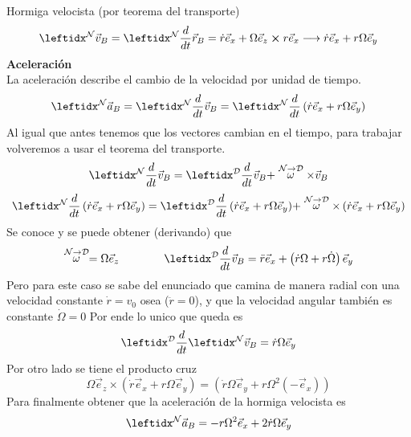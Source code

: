 \begin{solucion}{Hormiga velocista (por teorema del transporte)}
$$\marc{\vec{v}_B}{N}=\der{\vec{r}_B}{N}=\dot{r}\vec{e}_x+\Omega \vec{e}_z\cross r\vec{e}_x\longrightarrow \dot{r}\vec{e}_x+r\Omega \vec{e}_y$$
\textbf{Aceleración}\\
La aceleración describe el cambio de la velocidad por unidad de tiempo.\\
$$\marc{\vec{a}_B}{N}=\der{\vec{v}_B}{N}=\der{\left(\dot{r}\vec{e}_x+r\Omega \vec{e}_y\right)}{N}$$
Al igual que antes tenemos que los vectores cambian en el tiempo, para trabajar volveremos a usar el teorema del transporte.
$$\transport{\vec{v}_B}{N}{D}$$
$$\transport{\left(\dot{r}\vec{e}_x+r\Omega \vec{e}_y\right)}{N}{D}$$
Se conoce y se puede obtener (derivando) que
$$\velang{N}{D}=\Omega \vec{e}_z\quad\quad\quad\quad\der{\vec{v}_B}{D}=\ddot{r}\vec{e}_x+\left(\dot{r}\Omega+r\dot{\Omega}\right)\vec{e}_y$$
Pero para este caso se sabe del enunciado que camina de manera radial con una velocidad constante $\dot{r}=v_0$ osea ($\ddot{r}=0$), y que la velocidad angular también es constante $\dot{\Omega}=0$ Por ende lo unico que queda es
$$\der{}{D}\marc{\vec{v}_B}{N}=\dot{r}\Omega\vec{e}_y$$
Por otro lado se tiene el producto cruz
$$\Omega\vec{e}_z\times\left(\dot{r}\vec{e}_x+r\Omega \vec{e}_y\right)=\left(\dot{r}\Omega\vec{e}_y+r\Omega^2 (-\vec{e}_x)\right)$$
Para finalmente obtener que la aceleración de la hormiga velocista es 
$$\marc{\vec{a}_B}{N}=-r\Omega^2\vec{e}_x+2\dot{r}\Omega\vec{e}_y$$
\end{solucion}
